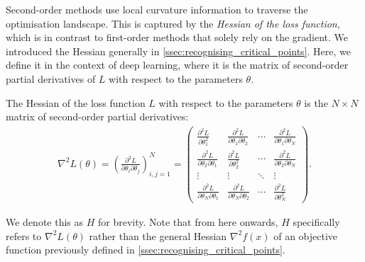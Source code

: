 Second-order methods use local curvature information to traverse the optimisation landscape. This is captured by the \textit{Hessian of the loss function}, which is in contrast to first-order methods that solely rely on the gradient. We introduced the Hessian generally in \cref{ssec:recognising_critical_points}. Here, we define it in the context of deep learning, where it is the matrix of second-order partial derivatives of $L$ with respect to the parameters $\theta$.
\begin{definition}
    The Hessian of the loss function $L$ with respect to the parameters $\theta$ is the $N \times N$ matrix of second-order partial derivatives:
    \begin{align}
        \nabla^2 L(\theta) = \left(\frac{\partial^2 L}{\partial \theta_i \partial \theta_j}\right)_{i,j=1}^N = 
        \begin{pmatrix}
            \frac{\partial^2 L}{\partial \theta_1^2} & \frac{\partial^2 L}{\partial \theta_1 \partial \theta_2} & \cdots & \frac{\partial^2 L}{\partial \theta_1 \partial \theta_N} \\
            \frac{\partial^2 L}{\partial \theta_2 \partial \theta_1} & \frac{\partial^2 L}{\partial \theta_2^2} & \cdots & \frac{\partial^2 L}{\partial \theta_2 \partial \theta_N} \\
            \vdots & \vdots & \ddots & \vdots \\
            \frac{\partial^2 L}{\partial \theta_N \partial \theta_1} & \frac{\partial^2 L}{\partial \theta_N \partial \theta_2} & \cdots & \frac{\partial^2 L}{\partial \theta_N^2}
        \end{pmatrix}.
    \end{align}
\end{definition}
We denote this as $H$ for brevity. Note that from here onwards, $H$ specifically refers to $\nabla^2 L(\theta)$ rather than the general Hessian $\nabla^2 f(x)$ of an objective function previously defined in \cref{ssec:recognising_critical_points}.

